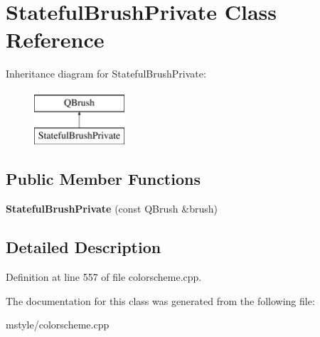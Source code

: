 \hypertarget{class_stateful_brush_private}{}\section{Stateful\+Brush\+Private Class Reference}
\label{class_stateful_brush_private}
Inheritance diagram for Stateful\+Brush\+Private\+:\begin{figure}[H]
\begin{center}
\leavevmode
\includegraphics[height=2.000000cm]{class_stateful_brush_private}
\end{center}
\end{figure}
\subsection*{Public Member Functions}
\begin{DoxyCompactItemize}
\item 
\mbox{\label{class_stateful_brush_private_af06ba74937bc154bcca0fa54804fba99}} 
{\bfseries Stateful\+Brush\+Private} (const Q\+Brush \&brush)
\end{DoxyCompactItemize}


\subsection{Detailed Description}


Definition at line 557 of file colorscheme.\+cpp.



The documentation for this class was generated from the following file\+:\begin{DoxyCompactItemize}
\item 
mstyle/colorscheme.\+cpp\end{DoxyCompactItemize}
